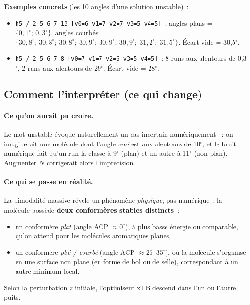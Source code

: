 \documentclass[11pt,a4paper]{article}
\begin{document}
\textbf{Exemples concrets} (les 10 angles d'une solution unstable)~:
\begin{itemize}[leftmargin=2em,itemsep=0.2em]
  \item \texttt{h5 / 2-5-6-7-13 [v0=6 v1=7 v2=7 v3=5 v4=5]}~:
    angles plans = $\{0{,}1^\circ;\ 0{,}3^\circ\}$,
    angles courbés = $\{30{,}8^\circ;\ 30{,}8^\circ;\ 30{,}8^\circ;\ 30{,}9^\circ;\ 30{,}9^\circ;\ 30{,}9^\circ;\ 31{,}2^\circ;\ 31{,}5^\circ\}$.
    Écart vide = 30,5$^\circ$.
  \item \texttt{h5 / 2-5-6-7-8 [v0=7 v1=7 v2=6 v3=5 v4=5]}~:
    8 runs aux alentours de 0,3$^\circ$, 2 runs aux alentours de 29$^\circ$.
    Écart vide = 28$^\circ$.
\end{itemize}

\subsection{Comment l'interpréter (ce qui change)}

\paragraph{Ce qu'on aurait pu croire.}
Le mot \og unstable\fg{} évoque naturellement un cas \og incertain numériquement \fg{}~: on imaginerait une molécule dont l'angle \emph{vrai} est aux alentours de 10$^\circ$, et le bruit numérique fait qu'un run la classe à 9$^\circ$ (plan) et un autre à 11$^\circ$ (non-plan). Augmenter $N$ corrigerait alors l'imprécision.

\paragraph{Ce qui se passe en réalité.}
La bimodalité massive révèle un phénomène \emph{physique}, pas numérique~: la molécule possède \textbf{deux conformères stables distincts}~:
\begin{itemize}[leftmargin=2em,itemsep=0.2em]
  \item un conformère \emph{plat} (angle ACP $\approx 0^\circ$), à plus basse énergie ou comparable, qu'on attend pour les molécules aromatiques planes,
  \item un conformère \emph{plié / courbé} (angle ACP $\approx 25\text{--}35^\circ$), où la molécule s'organise en une surface non plane (en forme de bol ou de selle), correspondant à un autre minimum local.
\end{itemize}
Selon la perturbation $z$ initiale, l'optimiseur xTB descend dans l'un ou l'autre puits.
\end{document}
